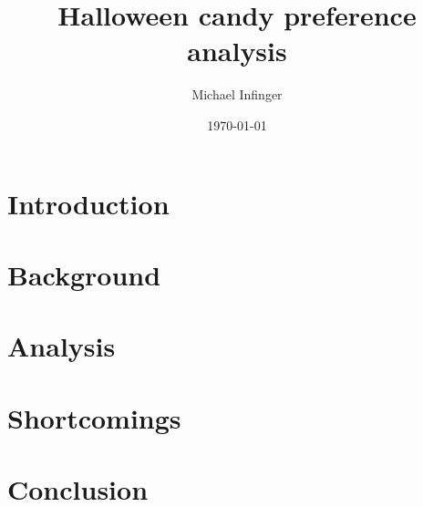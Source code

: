 \documentclass{article}
\title{Halloween candy preference analysis}
\author{Michael Infinger}
\date{\today}
\begin{document}
\maketitle

\section{Introduction}

\blindtext

\section{Background}

\blindtext

\section{Analysis}

\blindtext

\section{Shortcomings}

\blindtext

\section{Conclusion}

\blindtext
\end{document}
